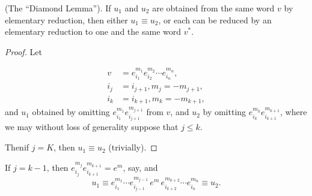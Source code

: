 \begin{lem}\label{chap4:sec2:lem2}%
  (The ``Diamond Lemma''). If $u_1$ and $u_2$ are obtained from the
  same word $v$ by elementary reduction, then either $u_1 \equiv u_2$,
  or each can be reduced by an elementary reduction to one and the
  same word $v^*$.  
\end{lem}

\begin{proof}
  Let
  
  \noindent 
  \begin{minipage}[c]{6cm}
    \begin{align*}
      v & =e^{m_1}_{i_1}e^{m_2}_{i_2}\cdots e^{m_n}_{i_n},\\
      i_j &=i_{j+1},m_j =-m_{j+1},\\
      i_k &= i_{k+1},m_k=-m_{k+1},
    \end{align*}
    and $u_1$ obtained by omitting $e^{m_1}_{i_1}e^{m_{j+1}}_{i_{j+1}}$
    from $v$, and $u_2$ by omitting $e^{m_k}_{i_k}e^{m_{k+1}}_{i_{k+1}}$,
    where we may without loss of generality suppose that $j \leq k$.  
  \end{minipage}
  \begin{minipage}[c]{4cm}
    \begin{figure}[H]
    \end{figure}
  \end{minipage}

  Then\pageoriginale if $j=K$, then $u_1 \equiv u_2$ (trivially).
\end{proof}

If $j=k-1$, then $e^{m_j}_{i_j}e^{m_{k+1}}_{i_{k+1}}=e^m$, say, and 
$$
u_1 \equiv e^{m_1}_{i_1}\cdots
e^{m_{j-1}}_{i_{j-1}} \,e^m \, e^{m_{k+2}}_{i_{k+2}}\cdots e^{m_n}_{i_n}\equiv
u_2. 
$$

